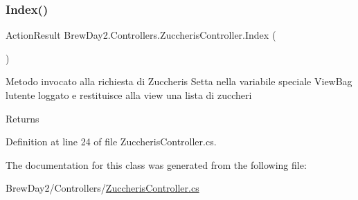 \subsubsection{\texorpdfstring{Index()}{Index()}}
{\footnotesize\ttfamily Action\+Result Brew\+Day2.\+Controllers.\+Zuccheris\+Controller.\+Index (\begin{DoxyParamCaption}{ }\end{DoxyParamCaption})}



Metodo invocato alla richiesta di Zuccheris Setta nella variabile speciale View\+Bag l\textquotesingle{}utente loggato e restituisce alla view una lista di zuccheri 

\begin{DoxyReturn}{Returns}

\end{DoxyReturn}


Definition at line 24 of file Zuccheris\+Controller.\+cs.



The documentation for this class was generated from the following file\+:\begin{DoxyCompactItemize}
\item 
Brew\+Day2/\+Controllers/\mbox{\hyperlink{_zuccheris_controller_8cs}{Zuccheris\+Controller.\+cs}}\end{DoxyCompactItemize}
